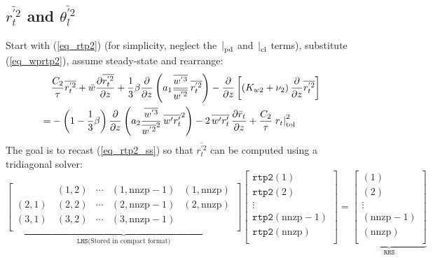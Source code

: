 \documentclass[11pt,fleqn]{article}
\newcommand{\ptlder}[2]{\frac{\partial #1}{\partial #2}}
\begin{document}
\subsection{ $\overline{r_t^{'2}}$ and $\overline{\theta_l^{'2}}$ }

Start with (\ref{eq_rtp2}) (for simplicity, neglect the 
$\left.\right|_{\rm{pd}}$ and $\left.\right|_{\rm{cl}}$ terms), substitute 
(\ref{eq_wprtp2}), assume steady-state and rearrange:
%
\begin{equation}
\begin{split}
\label{eq_rtp2_ss}
& \dfrac{C_2}{\tau} \overline{r_t^{'2}}
+ \bar{w}\ptlder{\overline{r^{'2}_t}}{z}
+ \frac{1}{3} \beta
   \ptlder{}{z}
     \left( 
       a_1
       \frac{\overline{w^{'3}}}{\overline{w^{'2}}} \,
       \overline{r_t^{'2}}
     \right)
- \ptlder{}{z} \left[ \left( K_{w2} + \nu_2 \right)
                      \ptlder{}{z} \overline{r_t^{'2}}
               \right]  \\
=& - \left( 1 - \frac{1}{3}\beta \right)
       \ptlder{}{z}
         \left( 
           a_2
           \frac{\overline{w^{'3}}}{\overline{w^{'2}}^2} \,
           \overline{w'r_t'}^2
         \right)
   - 2 \, \overline{w'r'_t} \, \ptlder{\bar{r}_t}{z} 
   + \dfrac{C_2}{\tau} \left. r_t \right|_{\rm{tol}}^{2}
\end{split}
\end{equation}
%
The goal is to recast (\ref{eq_rtp2_ss}) so that $\overline{r_t^{'2}}$
can be computed using a tridiagonal solver:
%
\begin{displaymath}
\underbrace{
\begin{bmatrix}
\phantom{(x,x)} & (1,2) & \cdots & (1,\mathrm{nnzp}-1) & (1,\mathrm{nnzp}) \\
(2,1)           & (2,2) & \cdots & (2,\mathrm{nnzp}-1) & (2,\mathrm{nnzp}) \\
(3,1)           & (3,2) & \cdots & (3,\mathrm{nnzp}-1) & \phantom{(x,nnzp)}\\
\end{bmatrix}}_{\mathtt{LHS} \textrm{(Stored in compact format)}}
\begin{bmatrix}
\mathtt{rtp2}(1) \\
\mathtt{rtp2}(2) \\
\vdots \\
\mathtt{rtp2}(\mathrm{nnzp}-1) \\
\mathtt{rtp2}(\mathrm{nnzp}) \\
\end{bmatrix}
=
\underbrace{
\begin{bmatrix}
(1) \\
(2) \\
\vdots \\
(\mathrm{nnzp-1}) \\
(\mathrm{nnzp}) \\
\end{bmatrix}}_{\mathtt{RHS}}
\end{displaymath}
\end{document}
